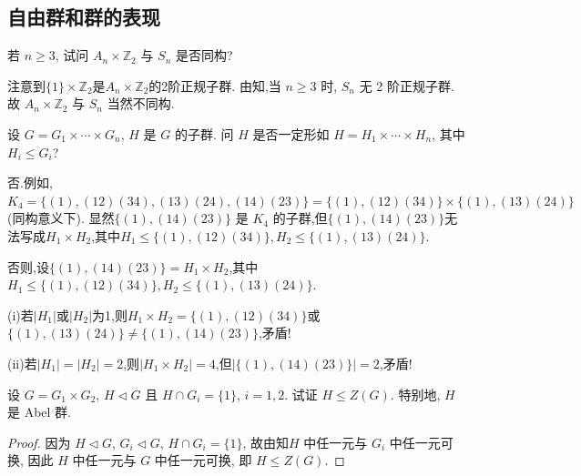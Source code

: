 \documentclass[../../main.tex]{subfiles}%
\begin{document}
\subsection{自由群和群的表现}

\begin{example}
若 $n \geqslant 3$, 试问 $A_n \times \mathbb{Z}_2$ 与 $S_n$ 是否同构?
\end{example}
\begin{solution}

注意到$\{1\}\times \mathbb{Z}_2$是$A_n \times \mathbb{Z}_2$的2阶正规子群.
由知,当 $n \geqslant 3$ 时, $S_n$ 无 2 阶正规子群. 故 $A_n \times \mathbb{Z}_2$ 与 $S_n$ 当然不同构.

\end{solution}

\begin{example}
设 $G = G_1 \times \cdots \times G_n$, $H$ 是 $G$ 的子群. 问 $H$ 是否一定形如 $H = H_1 \times \cdots \times H_n$, 其中 $H_i \leqslant G_i$?
\end{example}
\begin{solution}

否.例如, $K_4 = \{(1),(12)(34),(13)(24),(14)(23)\} = \{(1),(12)(34)\} \times \{(1),(13)(24)\}$(同构意义下). 显然$\{(1),(14)(23)\}$ 是 $K_4$ 的子群,但$\{(1),(14)(23)\}$无法写成$H_1\times H_2$,其中$H_1\leqslant \{(1),(12)(34)\},H_2\leqslant \{(1),(13)(24)\}$.

否则,设$\{(1),(14)(23)\}=H_1\times H_2$,其中$H_1\leqslant \{(1),(12)(34)\},H_2\leqslant \{(1),(13)(24)\}$.

(i)若$|H_1|$或$|H_2|$为1,则$H_1\times H_2 = \{(1),(12)(34)\}$或$\{(1),(13)(24)\}\neq \{(1),(14)(23)\}$,矛盾!

(ii)若$|H_1|=|H_2|=2$,则$|H_1\times H_2|=4$,但$|\{(1),(14)(23)\}|=2$,矛盾!

\end{solution}

\begin{example}
设 $G = G_1 \times G_2$, $H \lhd G$ 且 $H \cap G_i = \{1\}$, $i=1,2$. 试证 $H \leqslant Z(G)$. 特别地, $H$ 是 Abel 群.
\end{example}
\begin{proof}

因为 $H \lhd G$, $G_i \lhd G$, $H \cap G_i = \{1\}$, 故由知$H$ 中任一元与 $G_i$ 中任一元可换, 因此 $H$ 中任一元与 $G$ 中任一元可换, 即 $H \leqslant Z(G)$.

\end{proof}
\end{document}
